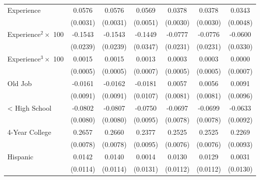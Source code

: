 {\begin{longtable}{l*{6}{c}}
Experience          &      0.0576\sym{***}&      0.0576\sym{***}&      0.0569\sym{***}&      0.0378\sym{***}&      0.0378\sym{***}&      0.0343\sym{***}\\
                    &    (0.0031)         &    (0.0031)         &    (0.0051)         &    (0.0030)         &    (0.0030)         &    (0.0048)         \\
Experience$^2\times$ 100&     -0.1543\sym{***}&     -0.1543\sym{***}&     -0.1449\sym{***}&     -0.0777\sym{***}&     -0.0776\sym{***}&     -0.0600\sym{*}  \\
                    &    (0.0239)         &    (0.0239)         &    (0.0347)         &    (0.0231)         &    (0.0231)         &    (0.0330)         \\
Experience$^3\times$ 100&      0.0015\sym{***}&      0.0015\sym{***}&      0.0013\sym{*}  &      0.0003         &      0.0003         &      0.0000         \\
                    &    (0.0005)         &    (0.0005)         &    (0.0007)         &    (0.0005)         &    (0.0005)         &    (0.0007)         \\
Old Job             &     -0.0161\sym{*}  &     -0.0162\sym{*}  &     -0.0181\sym{*}  &      0.0057         &      0.0056         &      0.0091         \\
                    &    (0.0091)         &    (0.0091)         &    (0.0107)         &    (0.0081)         &    (0.0081)         &    (0.0096)         \\
< High School       &     -0.0802\sym{***}&     -0.0807\sym{***}&     -0.0750\sym{***}&     -0.0697\sym{***}&     -0.0699\sym{***}&     -0.0633\sym{***}\\
                    &    (0.0080)         &    (0.0080)         &    (0.0095)         &    (0.0078)         &    (0.0078)         &    (0.0092)         \\
4-Year College      &      0.2657\sym{***}&      0.2660\sym{***}&      0.2377\sym{***}&      0.2525\sym{***}&      0.2525\sym{***}&      0.2269\sym{***}\\
                    &    (0.0078)         &    (0.0078)         &    (0.0095)         &    (0.0076)         &    (0.0076)         &    (0.0093)         \\
Hispanic            &      0.0142         &      0.0140         &      0.0014         &      0.0130         &      0.0129         &      0.0031         \\
                    &    (0.0114)         &    (0.0114)         &    (0.0131)         &    (0.0112)         &    (0.0112)         &    (0.0130)         \\

\end{longtable}}
